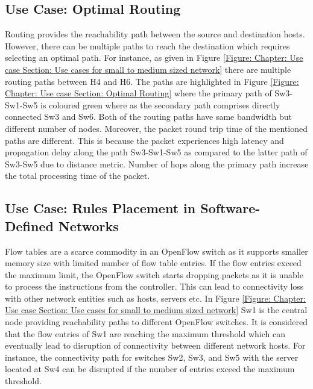 \subsection{Use Case: Optimal Routing}
\label{Chapter:Use Case and Requirements section:Shortest Path Routing}

Routing provides the reachability path between the source and destination hosts. However, there can be multiple paths to reach the destination which requires selecting an optimal path. For instance, as given in Figure \ref{Figure: Chapter: Use case Section: Use cases for small to medium sized network} there are multiple routing paths between H4 and H6. The paths are highlighted in Figure \ref{Figure: Chapter: Use case Section: Optimal Routing} where the primary path of Sw3-Sw1-Sw5 is coloured green where as the secondary path comprises directly connected Sw3 and Sw6. Both of the routing paths have same bandwidth but different number of nodes. Moreover, the packet round trip time of the mentioned paths are different. This is because the packet experiences high latency and propagation delay along the path Sw3-Sw1-Sw5 as compared to the latter path of Sw3-Sw5 due to distance metric. Number of hops along the primary path increase the total processing time of the packet.

\subsection{Use Case: Rules Placement in Software-Defined Networks}
\label{Chapter:Use Case and Requirements section: Flow Installation in an SDN Network}

Flow tables are a scarce commodity in an OpenFlow switch as it supports smaller memory size with limited number of flow table entries. If the flow entries exceed the maximum limit, the OpenFlow switch starts dropping packets as it is unable to process the instructions from the controller. This can lead to connectivity loss with other network entities such as hosts, servers etc. In Figure \ref{Figure: Chapter: Use case Section: Use cases for small to medium sized network} Sw1 is the central node providing reachability paths to different OpenFlow switches. It is considered that the flow entries of Sw1 are reaching the maximum threshold which can eventually lead to disruption of connectivity between different network hosts. For instance, the connectivity path for switches Sw2, Sw3, and Sw5 with the server located at Sw4 can be disrupted if the number of entries exceed the maximum threshold.    

